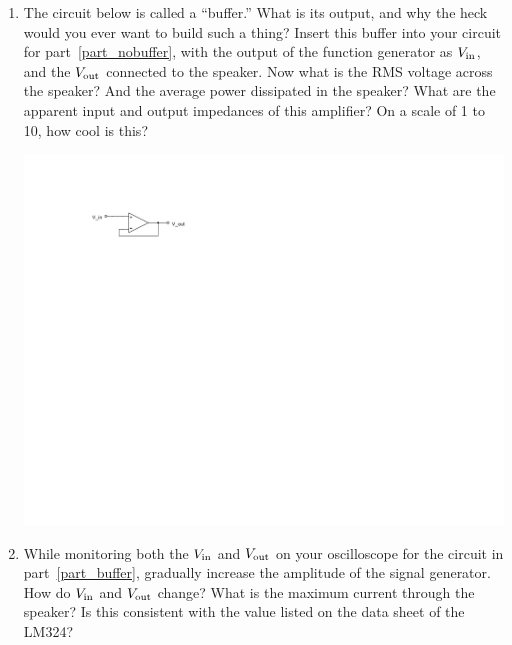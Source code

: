 \begin{enumerate}[wide]
\item The circuit below is called a ``buffer.'' What is its output, and why the heck would you ever want to build such a thing?  Insert this buffer into your circuit for part~\ref{part_nobuffer}, with the output of the function generator as $V_{\rm in}$, and the $V_{\rm out}$ connected to the speaker.  Now what is the RMS voltage across the speaker?  And the average power dissipated in the speaker?  What are the apparent input and output impedances of this amplifier?  On a scale of 1 to 10, how cool is this? \label{part_buffer}
\begin{center}
\includegraphics{op-amps/buffer.pdf}
\end{center}


\item While monitoring both the $V_{\rm in}$ and $V_{\rm out}$ on your oscilloscope for the circuit in part~\ref{part_buffer}, gradually increase the amplitude of the signal generator.  How do $V_{\rm in}$ and $V_{\rm out}$ change?  What is the maximum current through the speaker?  Is this consistent with the value listed on the data sheet of the LM324? 

\bigskip


\end{enumerate}
